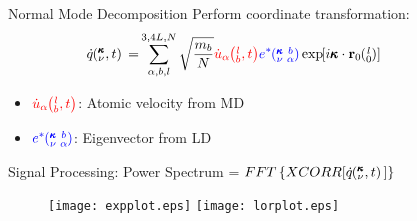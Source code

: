 \documentclass{beamer}
\newcommand{\EXP}[1]{\exp\mspace{-5.0mu}\left[#1\right]\mspace{-3.0mu}}
\newcommand{\lO}{\mspace{-4.0mu}\left(\mspace{-8.0mu}
\begin{smallmatrix}&l \\&0\end{smallmatrix}
\mspace{-3.0mu}\right)}
\newcommand{\kvba}{\mspace{-4.0mu}\left(\mspace{-8.0mu}
\begin{smallmatrix} &\pmb{\kappa} &b \\ &\nu &\alpha\end{smallmatrix}
\mspace{-3.0mu}\right)}
\newcommand{\kvt}{\mspace{-4.0mu}\left(\mspace{-8.0mu}
\begin{smallmatrix}&\pmb{\kappa} \\&\nu\end{smallmatrix}
\mspace{-2.0mu},t\right)}
\newcommand{\kvw}{\mspace{-4.0mu}\left(\mspace{-8.0mu}
\begin{smallmatrix}&\pmb{\kappa} \\&\nu\end{smallmatrix}
\mspace{-2.0mu},\omega\right)}
\newcommand{\kv}{\mspace{-4.0mu}\left(\mspace{-8.0mu}
\begin{smallmatrix}&\pmb{\kappa} \\&\nu\end{smallmatrix}
\mspace{-3.0mu}\right)}
\newcommand{\lbt}{\mspace{-4.0mu}\left(\mspace{-8.0mu}
\begin{smallmatrix}&l \\&b\end{smallmatrix}\mspace{-2.0mu},t\right)}
\begin{document}
\begin{frame}{Normal Mode Decomposition}
Perform coordinate transformation:
\begin{equation}\label{EQ:NMD:qdot}
\begin{split}
\hspace*{-1cm}\dot{q}\kvt{}{}{}=&\sum_{\alpha, b, l}^{3,4L,N}\sqrt{\frac{m_b}{N}}\textcolor{red}{\dot{u}_{\alpha}\lbt}\textcolor{blue}{e^*\kvba}\EXP{i\pmb{\kappa}\cdot\mathbf{r}_0\lO}
\end{split}
\end{equation}
\hspace*{-1cm}\begin{itemize}
\item $\textcolor{red}{\dot{u}_{\alpha}\lbt}$: Atomic velocity from MD
\item $\textcolor{blue}{e^*\kvba}$: Eigenvector from LD
\end{itemize}
Signal Processing:
Power Spectrum = $FFT\left \{XCORR[\dot{q}\kvt{}{}{}] \right\} $
\begin{figure}%
\begin{center}
\texttt{[image: expplot.eps]} \hspace{0.05\textwidth}%
\texttt{[image: lorplot.eps]} \\[2em]
\end{center}
\end{figure}
\vspace*{-1cm}
\end{frame}
\end{document}
